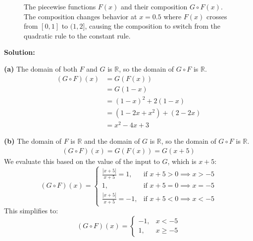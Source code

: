 \begin{figure}[h]
\centering
{}
\caption{The piecewise functions $F(x)$ and their composition $G \circ F(x)$. The composition changes behavior at $x=0.5$ where $F(x)$ crosses from $[0,1]$ to $(1,2]$, causing the composition to switch from the quadratic rule to the constant rule.}
\end{figure}

\bigskip\noindent\textbf{Solution:}

\textbf{(a)}
The domain of both \(F\) and \(G\) is \(\mathbb{R}\), so the domain of \(G \circ F\) is \(\mathbb{R}\).
\begin{align*}
(G \circ F)(x) &= G(F(x)) \\
&= G(1-x) \\
&= (1-x)^2 + 2(1-x) \\
&= (1 - 2x + x^2) + (2 - 2x) \\
&= x^2 - 4x + 3
\end{align*}

\textbf{(b)}
The domain of \(F\) is \(\mathbb{R}\) and the domain of \(G\) is \(\mathbb{R}\), so the domain of \(G \circ F\) is \(\mathbb{R}\).
\begin{align*}
(G \circ F)(x) = G(F(x)) = G(x+5)
\end{align*}
We evaluate this based on the value of the input to \(G\), which is \(x+5\):
\[ (G \circ F)(x) = 
\begin{cases} 
\frac{|x+5|}{x+5} = 1, & \text{if } x+5 > 0 \implies x > -5 \\
1, & \text{if } x+5 = 0 \implies x = -5 \\
\frac{|x+5|}{x+5} = -1, & \text{if } x+5 < 0 \implies x < -5 
\end{cases}
\]
This simplifies to:
\[ (G \circ F)(x) = \begin{cases} -1, & x < -5 \\ 1, & x \ge -5 \end{cases} \]

